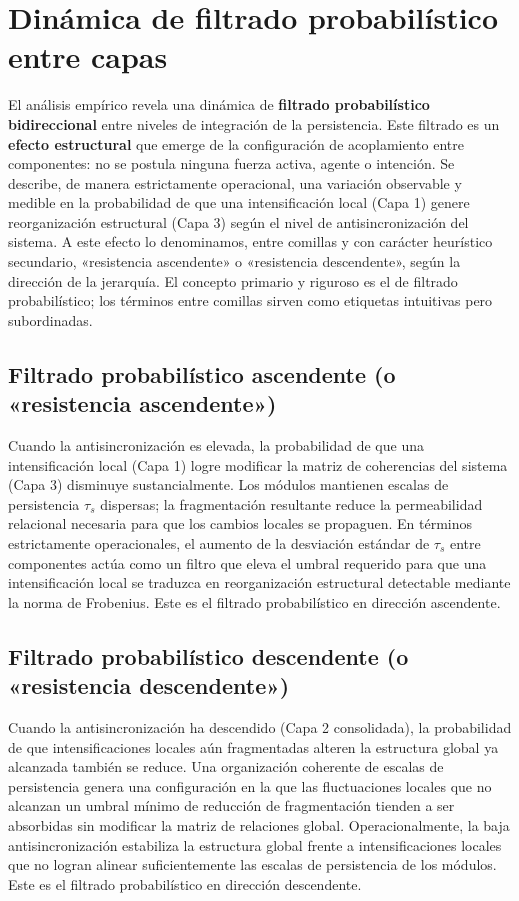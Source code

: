 \section{Dinámica de filtrado probabilístico entre capas}

El análisis empírico revela una dinámica de \textbf{filtrado probabilístico bidireccional} entre niveles de integración de la persistencia. Este filtrado es un \textbf{efecto estructural} que emerge de la configuración de acoplamiento entre componentes: no se postula ninguna fuerza activa, agente o intención. Se describe, de manera estrictamente operacional, una variación observable y medible en la probabilidad de que una intensificación local (Capa 1) genere reorganización estructural (Capa 3) según el nivel de antisincronización del sistema. A este efecto lo denominamos, entre comillas y con carácter heurístico secundario, «resistencia ascendente» o «resistencia descendente», según la dirección de la jerarquía. El concepto primario y riguroso es el de filtrado probabilístico; los términos entre comillas sirven como etiquetas intuitivas pero subordinadas.

\subsection{Filtrado probabilístico ascendente (o «resistencia ascendente»)}

Cuando la antisincronización es elevada, la probabilidad de que una intensificación local (Capa 1) logre modificar la matriz de coherencias del sistema (Capa 3) disminuye sustancialmente. Los módulos mantienen escalas de persistencia $\tau_s$ dispersas; la fragmentación resultante reduce la permeabilidad relacional necesaria para que los cambios locales se propaguen. En términos estrictamente operacionales, el aumento de la desviación estándar de $\tau_s$ entre componentes actúa como un filtro que eleva el umbral requerido para que una intensificación local se traduzca en reorganización estructural detectable mediante la norma de Frobenius. Este es el filtrado probabilístico en dirección ascendente.

\subsection{Filtrado probabilístico descendente (o «resistencia descendente»)}

Cuando la antisincronización ha descendido (Capa 2 consolidada), la probabilidad de que intensificaciones locales aún fragmentadas alteren la estructura global ya alcanzada también se reduce. Una organización coherente de escalas de persistencia genera una configuración en la que las fluctuaciones locales que no alcanzan un umbral mínimo de reducción de fragmentación tienden a ser absorbidas sin modificar la matriz de relaciones global. Operacionalmente, la baja antisincronización estabiliza la estructura global frente a intensificaciones locales que no logran alinear suficientemente las escalas de persistencia de los módulos. Este es el filtrado probabilístico en dirección descendente.

